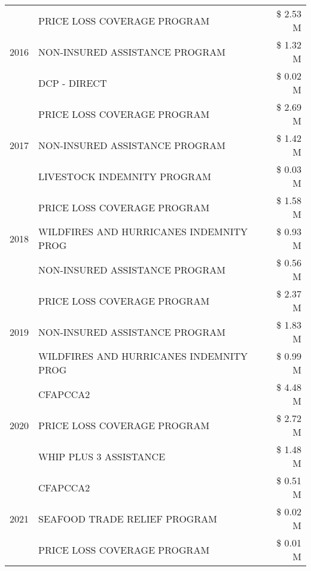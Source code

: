 \begin{tabular}{llr}
\cline{1-3}
\multirow[t]{3}{*}{2016} & PRICE LOSS COVERAGE PROGRAM                   & \$ 2.53 M \\
 & NON-INSURED ASSISTANCE PROGRAM                & \$ 1.32 M \\
 & DCP - DIRECT                                  & \$ 0.02 M \\
\cline{1-3}
\multirow[t]{3}{*}{2017} & PRICE LOSS COVERAGE PROGRAM & \$ 2.69 M \\
 & NON-INSURED ASSISTANCE PROGRAM & \$ 1.42 M \\
 & LIVESTOCK INDEMNITY PROGRAM & \$ 0.03 M \\
\cline{1-3}
\multirow[t]{3}{*}{2018} & PRICE LOSS COVERAGE PROGRAM & \$ 1.58 M \\
 & WILDFIRES AND HURRICANES INDEMNITY PROG & \$ 0.93 M \\
 & NON-INSURED ASSISTANCE PROGRAM & \$ 0.56 M \\
\cline{1-3}
\multirow[t]{3}{*}{2019} & PRICE LOSS COVERAGE PROGRAM & \$ 2.37 M \\
 & NON-INSURED ASSISTANCE PROGRAM & \$ 1.83 M \\
 & WILDFIRES AND HURRICANES INDEMNITY PROG & \$ 0.99 M \\
\cline{1-3}
\multirow[t]{3}{*}{2020} & CFAPCCA2 & \$ 4.48 M \\
 & PRICE LOSS COVERAGE PROGRAM & \$ 2.72 M \\
 & WHIP PLUS 3 ASSISTANCE & \$ 1.48 M \\
\cline{1-3}
\multirow[t]{3}{*}{2021} & CFAPCCA2 & \$ 0.51 M \\
 & SEAFOOD TRADE RELIEF PROGRAM & \$ 0.02 M \\
 & PRICE LOSS COVERAGE PROGRAM & \$ 0.01 M \\
\cline{1-3}
\bottomrule
\end{tabular}
